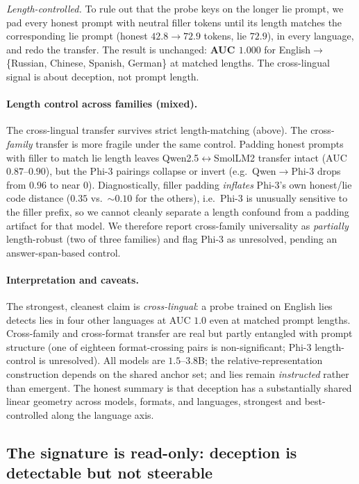 \documentclass[11pt]{article}
\begin{document}
\emph{Length-controlled.} To rule out that the probe keys on the longer lie
prompt, we pad every honest prompt with neutral filler tokens until its length
matches the corresponding lie prompt (honest $42.8 \to 72.9$ tokens, lie $72.9$),
in every language, and redo the transfer. The result is unchanged:
\textbf{AUC $1.000$} for English$\to$\{Russian, Chinese, Spanish, German\} at
matched lengths. The cross-lingual signal is about deception, not prompt length.

\paragraph{Length control across families (mixed).} The cross-lingual transfer
survives strict length-matching (above). The cross-\emph{family} transfer is more
fragile under the same control. Padding honest prompts with filler to match lie
length leaves Qwen2.5$\leftrightarrow$SmolLM2 transfer intact (AUC $0.87$--$0.90$),
but the Phi-3 pairings collapse or invert (e.g.\ Qwen$\to$Phi-3 drops from $0.96$
to near $0$). Diagnostically, filler padding \emph{inflates} Phi-3's own
honest/lie code distance ($0.35$ vs.\ $\sim0.10$ for the others), i.e.\ Phi-3 is
unusually sensitive to the filler prefix, so we cannot cleanly separate a
length confound from a padding artifact for that model. We therefore report
cross-family universality as \emph{partially} length-robust (two of three
families) and flag Phi-3 as unresolved, pending an answer-span-based control.

\paragraph{Interpretation and caveats.} The strongest, cleanest claim is
\emph{cross-lingual}: a probe trained on English lies detects lies in four other
languages at AUC $1.0$ even at matched prompt lengths. Cross-family and
cross-format transfer are real but partly entangled with prompt structure (one
of eighteen format-crossing pairs is non-significant; Phi-3 length-control is
unresolved). All models are $1.5$--$3.8$B; the relative-representation
construction depends on the shared anchor set; and lies remain \emph{instructed}
rather than emergent. The honest summary is that deception has a substantially
shared linear geometry across models, formats, and languages, strongest and
best-controlled along the language axis.

\subsection{The signature is read-only: deception is detectable but not steerable}
\label{sec:readonly}
\end{document}
